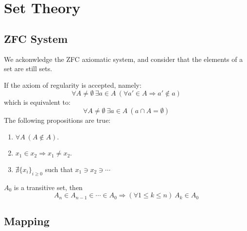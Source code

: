 \chapter{Set Theory}



\section{ZFC System}

We ackonwledge the ZFC axiomatic system, and consider that the elements of a set are still sets. 


\begin{proposition}
  If the axiom of regularity is accepted, namely:
  \[
    \forall A \neq \emptyset \ \exists a \in A \ (\forall a' \in A \Rightarrow a' \notin a)
  \]
  which is equivalent to:
  \[
    \forall A \neq \emptyset \ \exists a \in A \ (a \cap A = \emptyset)
  \]
  The following propositions are true:
  \begin{enumerate}
    \item $\forall A \ (A \notin A)$.
    \item $x_1 \in x_2 \Rightarrow x_1 \neq x_2$.
    \item $\nexists \{ x_i \}_{i \geq 0}$ such that $x_1 \ni x_2 \ni \cdots$
  \end{enumerate}
\end{proposition}





\begin{corollary}
  $A_0$ is a transitive set, then
  \[
    A_n \in A_{n-1} \in \cdots \in A_0 \Rightarrow (\forall 1 \leq k \leq n) \  A_k \in A_0
  \]
\end{corollary}




\section{Mapping}



